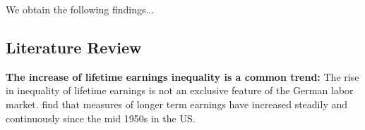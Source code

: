 \documentclass[12pt, a4paper]{article}
\begin{document}
We obtain the following findings...







%


\subsection{Literature Review}

\textbf{The increase of lifetime earnings inequality is a common trend:} The rise in inequality of lifetime earnings is not an exclusive feature of the German labor market. \cite{Kopczuk2010} find that measures of longer term earnings have increased steadily and continuously since the mid 1950s in the US.
\end{document}
